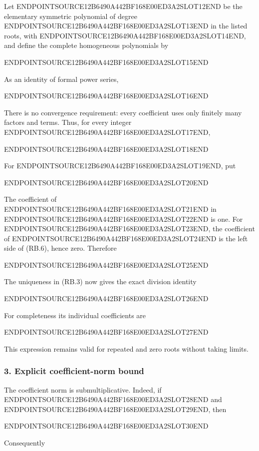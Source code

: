 Let ENDPOINTSOURCE12B6490A442BF168E00ED3A2SLOT12END be the elementary symmetric polynomial of degree ENDPOINTSOURCE12B6490A442BF168E00ED3A2SLOT13END in the listed roots, with ENDPOINTSOURCE12B6490A442BF168E00ED3A2SLOT14END, and define the complete homogeneous polynomials by

ENDPOINTSOURCE12B6490A442BF168E00ED3A2SLOT15END

As an identity of formal power series,

ENDPOINTSOURCE12B6490A442BF168E00ED3A2SLOT16END

There is no convergence requirement: every coefficient uses only finitely many factors and terms. Thus, for every integer ENDPOINTSOURCE12B6490A442BF168E00ED3A2SLOT17END,

ENDPOINTSOURCE12B6490A442BF168E00ED3A2SLOT18END

For ENDPOINTSOURCE12B6490A442BF168E00ED3A2SLOT19END, put

ENDPOINTSOURCE12B6490A442BF168E00ED3A2SLOT20END

The coefficient of ENDPOINTSOURCE12B6490A442BF168E00ED3A2SLOT21END in ENDPOINTSOURCE12B6490A442BF168E00ED3A2SLOT22END is one. For ENDPOINTSOURCE12B6490A442BF168E00ED3A2SLOT23END, the coefficient of ENDPOINTSOURCE12B6490A442BF168E00ED3A2SLOT24END is the left side of (RB.6), hence zero. Therefore

ENDPOINTSOURCE12B6490A442BF168E00ED3A2SLOT25END

The uniqueness in (RB.3) now gives the exact division identity

ENDPOINTSOURCE12B6490A442BF168E00ED3A2SLOT26END

For completeness its individual coefficients are

ENDPOINTSOURCE12B6490A442BF168E00ED3A2SLOT27END

This expression remains valid for repeated and zero roots without taking limits.

\subsubsection{3. Explicit coefficient-norm bound}\label{endpoint-relation_balance_original--explicit-coefficient-norm-bound}

The coefficient norm is submultiplicative. Indeed, if ENDPOINTSOURCE12B6490A442BF168E00ED3A2SLOT28END and ENDPOINTSOURCE12B6490A442BF168E00ED3A2SLOT29END, then

ENDPOINTSOURCE12B6490A442BF168E00ED3A2SLOT30END

Consequently

